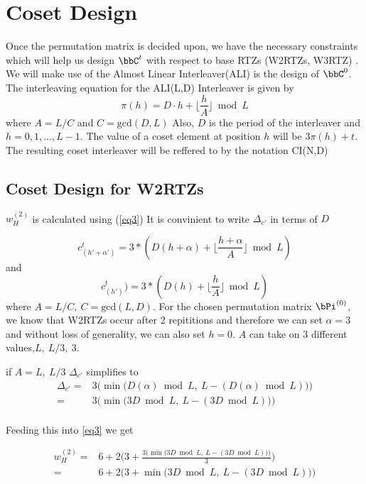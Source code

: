 \section{Coset Design}
Once the permutation matrix is decided upon, we have the necessary constraints which will help us design $\bbC^t$ with respect to base RTZs (W2RTZs, W3RTZ)  .
We will make use of the Almost Linear Interleaver(ALI) is the design of $\bbC^0$. 
The interleaving equation for the ALI(L,D) Interleaver is given by 
$$
\pi(h)=D \cdot h + \Big\lfloor \frac{h}{A} \Big\rfloor \bmod L
$$ 
where $A=L/C$ and $C=\text{gcd}(D,L)$ Also, $D$ is the period of the interleaver and $h=0,1,...,L-1$. 
The value of a coset element at position $h$ will be $3\pi(h)+t$. The resulting coset interleaver will be reffered to by the notation CI(N,D)


\subsection{Coset Design for W2RTZs}
$w_H^{(2)}$ is calculated using (\ref{eq3})
 It is convinient to write $\Delta_{c'}$ in terms of $D$ 

$$c_{(h'+\alpha')}^{t}=3*(D(h+\alpha)+ \lfloor \frac{h+\alpha}{A} \rfloor \bmod L)$$ and $$c_{(h')}^{t})=3*(D(h)+ \lfloor \frac{h}{A} \rfloor \bmod L)$$
where $A=L/C,~C=\text{gcd}(L,D)$. 
For the chosen permutation matrix $\bPi^{(0)}$, we know that W2RTZs occur after 2 repititions and therefore we can set $\alpha =3$ and without loss of generality, we can also set $h=0$. 
$A$ can take on $3$ different values,$L,~L/3,~3$.

if $A=L,~L/3$ $\Delta_{c'}$ simplifies to 
\begin{equation}
\begin{split}
\Delta_{c'}=&3\Bigg(\min{\Big(D(\alpha) \bmod L,~ L-(D(\alpha) \bmod L)\Big)\Bigg)}\\
=&3\Bigg(\min{\Big(3D \bmod L,~ L-(3D \bmod L)\Big)\Bigg)}\\
\end{split}
\end{equation}

Feeding this into \ref{eq3} we get

\begin{equation*}
\begin{split}
w^{(2)}_H=&6+2\Bigg(3+\frac{3\Big(\min{\Big(3D \bmod L,~ L-(3D \bmod L)\Big)\Big)}}{3}\Bigg)\\
=&6+2\Big(3+\min{\Big(3D \bmod L,~ L-(3D \bmod L)\Big)}\Big)
\end{split}
\end{equation*}

